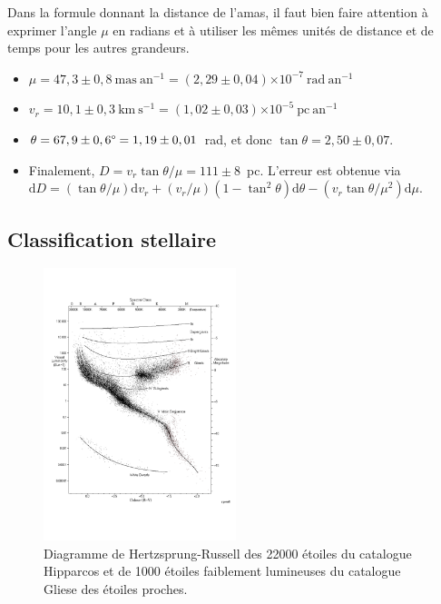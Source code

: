 \documentclass[a4paper,10pt]{report}
\newcommand{\e}[1]{\ensuremath{\times 10^{#1}}}
\renewcommand{\d}{\ensuremath{\mathrm{d}}}
\renewcommand{\deg}{\ensuremath{\degree}}
\renewcommand{\u}[1]{\ensuremath{\mathrm{#1}}} %
\begin{document}
\begin{Answer}
  Dans la formule donnant la distance de l'amas, il faut bien faire
  attention à exprimer l'angle $\mu$ en radians et à utiliser les
  mêmes unités de distance et de temps pour les autres grandeurs.
  \begin{itemize}
  \item $\mu = 47,3 \pm 0,8~\u{mas~an^{-1}} = 
    (2,29 \pm 0,04) \e{-7}~\u{rad~an^{-1}}$
  \item $v_r = 10,1 \pm 0,3~\u{km~s^{-1}} = 
    (1,02 \pm 0,03) \e{-5}~\u{pc~an^{-1}}$
  \item $\theta = 67,9 \pm 0,6\deg = 1,19 \pm 0,01$~rad, et donc $\tan
    \theta= 2,50 \pm 0,07$.
  \item Finalement, $D = v_{r}\tan\theta/\mu = 111 \pm 8$~pc. L'erreur
    est obtenue via $\d D = (\tan\theta/\mu)\d v_{r} +
    (v_{r}/\mu)(1-\tan^{2}\theta)\d\theta -
    (v_{r}\tan\theta/\mu^{2})\d\mu$.
  \end{itemize}
\end{Answer}

\subsection{Classification stellaire}

\begin{figure}
  \centering
  \includegraphics[width=0.5\textwidth]{hr}
  \caption{Diagramme de Hertzsprung-Russell des 22000 étoiles du
    catalogue Hipparcos et de 1000 étoiles faiblement lumineuses du
    catalogue Gliese des étoiles proches.}
  \label{hr}
\end{figure}
\end{document}
